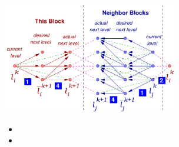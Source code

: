 \begin{frame}[fragile]
\secframetitle{\ssAdapt}
\begin{center}
\begin{minipage}{3in}
\includegraphics[width=3in]{amr-2.pdf}
\end{minipage}
\end{center}
\pause
\begin{itemize}
\item {}
\pause
\item {}
\end{itemize}
\end{frame}


\begin{frame}[fragile] 
\secframetitle{\ssAdapt}
\blockblue
\begin{center}
\begin{minipage}{2.5in}
\end{minipage}
\end{center}
\end{frame}
